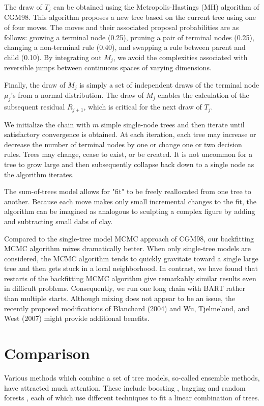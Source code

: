 \documentclass[a4paper,11pt]{article}
\begin{document}
The draw of \( T_j \) can be obtained using the Metropolis-Hastings (MH) algorithm of CGM98. This algorithm proposes a new tree based on the current tree using one of four moves. The moves and their associated proposal probabilities are as follows: growing a terminal node (0.25), pruning a pair of terminal nodes (0.25), changing a non-terminal rule (0.40), and swapping a rule between parent and child (0.10). By integrating out \( M_j \), we avoid the complexities associated with reversible jumps between continuous spaces of varying dimensions.

Finally, the draw of \( M_j \) is simply a set of independent draws of the terminal node \( \mu_j \)'s from a normal distribution. The draw of \( M_j \) enables the calculation of the subsequent residual \( R_{j+1} \), which is critical for the next draw of \( T_j \). 

We initialize the chain with \( m \) simple single-node trees and then iterate until satisfactory convergence is obtained. At each iteration, each tree may increase or decrease the number of terminal nodes by one or change one or two decision rules. Trees may change, cease to exist, or be created. It is not uncommon for a tree to grow large and then subsequently collapse back down to a single node as the algorithm iterates. 

The sum-of-trees model allows for "fit" to be freely reallocated from one tree to another. Because each move makes only small incremental changes to the fit, the algorithm can be imagined as analogous to sculpting a complex figure by adding and subtracting small dabs of clay.

Compared to the single-tree model MCMC approach of CGM98, our backfitting MCMC algorithm mixes dramatically better. When only single-tree models are considered, the MCMC algorithm tends to quickly gravitate toward a single large tree and then gets stuck in a local neighborhood. In contrast, we have found that restarts of the backfitting MCMC algorithm give remarkably similar results even in difficult problems. Consequently, we run one long chain with BART rather than multiple starts. Although mixing does not appear to be an issue, the recently proposed modifications of Blanchard (2004) and Wu, Tjelmeland, and West (2007) might provide additional benefits.

\section{Comparison}
Various methods which combine a set of tree models, so-called ensemble methods, have attracted much attention. These include boosting \cite{freund1997} \cite{friedman2001}, bagging \cite{breiman1996} and random forests \cite{breiman2001}, each of which use different techniques to fit a linear combination of trees.
\end{document}
